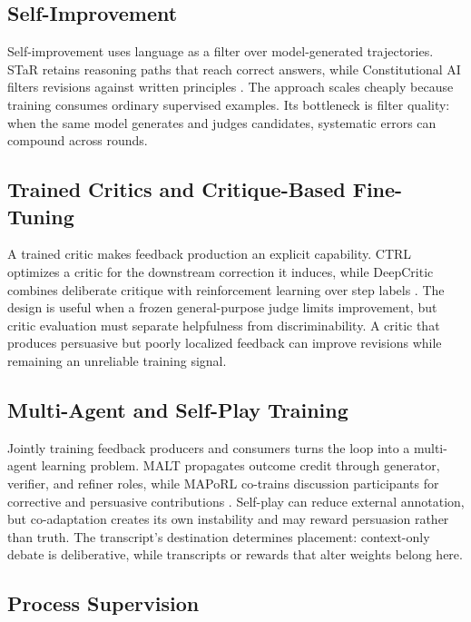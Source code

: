 \subsection{Self-Improvement}
\label{subsec:self-improvement}

Self-improvement uses language as a filter over model-generated trajectories. STaR retains reasoning paths that reach correct answers, while Constitutional AI filters revisions against written principles \citep{zelikman2022star,bai2022constitutional}. The approach scales cheaply because training consumes ordinary supervised examples. Its bottleneck is filter quality: when the same model generates and judges candidates, systematic errors can compound across rounds.

\subsection{Trained Critics and Critique-Based Fine-Tuning}
\label{subsec:trained-critics}

A trained critic makes feedback production an explicit capability. CTRL optimizes a critic for the downstream correction it induces, while DeepCritic combines deliberate critique with reinforcement learning over step labels \citep{xie2025teaching,yang2025deepcritic}. The design is useful when a frozen general-purpose judge limits improvement, but critic evaluation must separate helpfulness from discriminability. A critic that produces persuasive but poorly localized feedback can improve revisions while remaining an unreliable training signal.

\subsection{Multi-Agent and Self-Play Training}
\label{subsec:selfplay-training}

Jointly training feedback producers and consumers turns the loop into a multi-agent learning problem. MALT propagates outcome credit through generator, verifier, and refiner roles, while MAPoRL co-trains discussion participants for corrective and persuasive contributions \citep{motwani2024malt,park2025maporl}. Self-play can reduce external annotation, but co-adaptation creates its own instability and may reward persuasion rather than truth. The transcript's destination determines placement: context-only debate is deliberative, while transcripts or rewards that alter weights belong here.

\subsection{Process Supervision}
\label{subsec:process-supervision}


